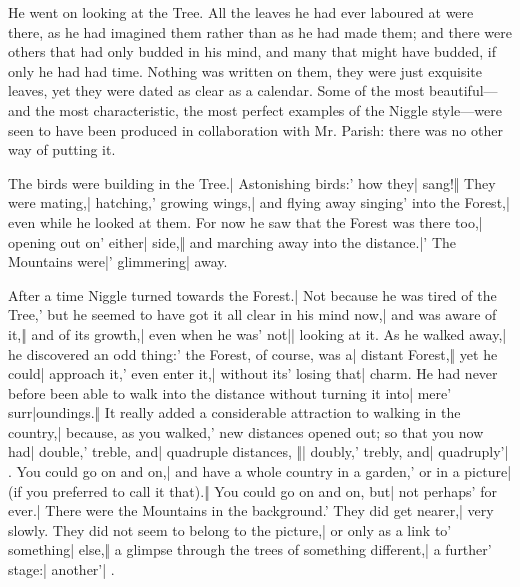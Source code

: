 He went on looking at the Tree. All the leaves he had ever laboured at were there, as he had imagined them rather than as he had made them; and there were others that had only budded in his mind, and many that might have budded, if only he had had time. Nothing was written on them, they were just exquisite leaves, yet they were dated as clear as a calendar. Some of the most beautiful—and the most characteristic, the most perfect examples of the Niggle style—were seen to have been produced in collaboration with Mr. Parish: there was no other way of putting it.


\begin{itemize}
\halfone The birds were building in the Tree.| Astonishing birds:' how they| sang!‖ They were mating,| hatching,' growing wings,| and flying away singing' into the Forest,| even while he looked at them.
\halftwo For now he saw that the Forest was there too,| opening out on' either| side,‖ and marching away into the distance.|' The Mountains were|' glimmering|  away.
\end{itemize}

\begin{itemize}
\halfone After a time Niggle turned towards the Forest.| Not because he was tired of the Tree,' but he seemed to have got it all clear in his mind now,| and was aware of it,‖ and of its growth,| even when he was' not|| looking at it.
\halftwo As he walked away,| he discovered an odd thing:' the Forest, of course, was a| distant Forest,‖ yet he could| approach it,' even enter it,| without its' losing that|  charm.
\halfone He had never before been able to walk into the distance without turning it into| mere' surr|oundings.‖ It really added a considerable attraction to walking in the country,| because, as you walked,' new distances opened out; so that you now had| double,' treble, and| quadruple distances,
\quarterfour ‖| doubly,' trebly, and| quadruply'| .
\halfone You could go on and on,| and have a whole country in a garden,' or in a picture| (if you preferred to call it that).‖ You could go on and on, but| not perhaps' for ever.| There were the Mountains in the background.' They did get nearer,| very slowly.
\halftwo They did not seem to belong to the picture,| or only as a link to' something| else,‖ a glimpse through the trees of something different,| a further' stage:| another'| .
\end{itemize}

